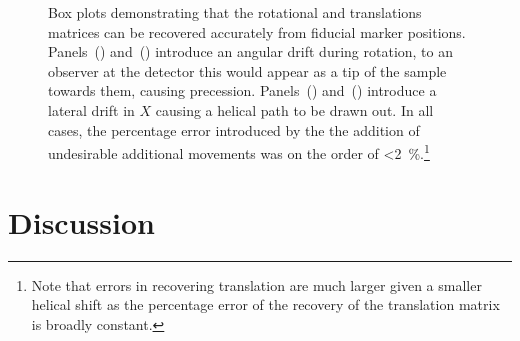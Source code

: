 \documentclass{osa-article}
\begin{document}
\begin{figure}
  \bigskip
  \caption[Box plots demonstrating that the rotational and translations matrices can be recovered accurately from fiducial marker positions]{Box plots demonstrating that the rotational and translations matrices can be recovered accurately from fiducial marker positions.
    Panels~() and~() introduce an angular drift during rotation, to an observer at the detector this would appear as a tip of the sample towards them, causing precession.
    Panels~() and~() introduce a lateral drift in \(X\) causing a helical path to be drawn out.
    In all cases, the percentage error introduced by the the addition of undesirable additional movements was on the order of \SI{<2}{\percent}.\footnote{Note that errors in recovering translation are much larger given a smaller helical shift as the percentage error of the recovery of the translation matrix is broadly constant.}
  }\label{fig:pc_sum_decompose}
\end{figure}

\section*{Discussion}
\end{document}
